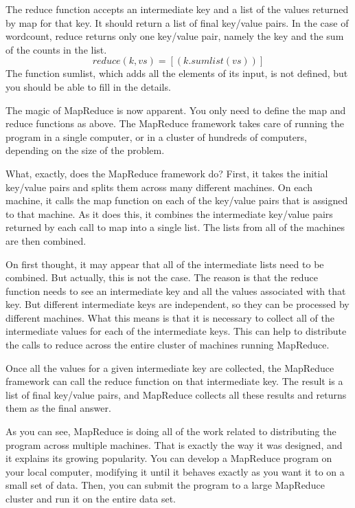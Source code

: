 The reduce function accepts an intermediate key and a list of
the values returned by map for that key.  It should return a
list of final key/value pairs.  In the case of wordcount,
reduce returns only one key/value pair, namely the key and the
sum of the counts in the list.
\begin{displaymath}
reduce(k, vs) = [ ( k . sumlist(vs) ) ]
\end{displaymath}
The function sumlist, which adds all the elements of its
input, is not defined, but you should be able to fill in the
details.

The magic of MapReduce is now apparent.  You only need to
define the map and reduce functions as above.  The MapReduce
framework takes care of running the program in a single
computer, or in a cluster of hundreds of computers, depending
on the size of the problem.

What, exactly, does the MapReduce framework do?  First, it
takes the initial key/value pairs and splits them across many
different machines.  On each machine, it calls the map
function on each of the key/value pairs that is assigned to
that machine.  As it does this, it combines the intermediate
key/value pairs returned by each call to map into a single
list.  The lists from all of the machines are then combined.

On first thought, it may appear that all of the intermediate
lists need to be combined.  But actually, this is not the
case.  The reason is that the reduce function needs to see an
intermediate key and all the values associated with that key.
But different intermediate keys are independent, so they can
be processed by different machines.  What this means is that
it is necessary to collect all of the intermediate values for
each of the intermediate keys.  This can help to distribute
the calls to reduce across the entire cluster of machines
running MapReduce.

Once all the values for a given intermediate key are
collected, the MapReduce framework can call the reduce
function on that intermediate key.  The result is a list of
final key/value pairs, and MapReduce collects all these
results and returns them as the final answer.

As you can see, MapReduce is doing all of the work
related to distributing the program across multiple machines.
That is exactly the way it was designed, and it explains its
growing popularity.  You can develop a MapReduce program on
your local computer, modifying it until it behaves exactly as
you want it to on a small set of data.  Then, you can submit
the program to a large MapReduce cluster and run it on the
entire data set.

